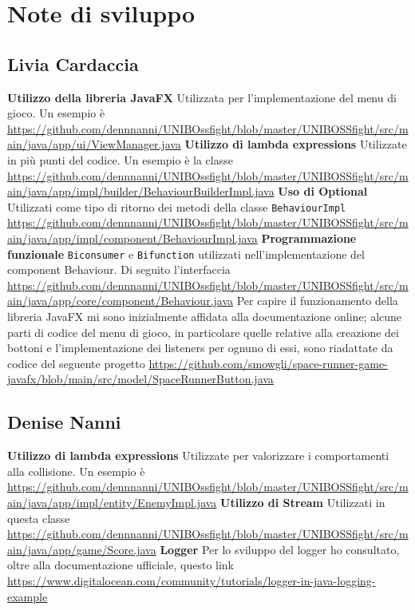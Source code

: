\documentclass[a4paper,12pt]{report}
\begin{document}
\section{Note di sviluppo}
\subsection{Livia Cardaccia}
\small
\textbf{Utilizzo della libreria JavaFX}
\newline
Utilizzata per l'implementazione del menu di gioco. Un esempio è \url{https://github.com/dennnanni/UNIBOssfight/blob/master/UNIBOSSfight/src/main/java/app/ui/ViewManager.java}
\newline
\textbf{Utilizzo di lambda expressions}
\newline
Utilizzate in più punti del codice. Un esempio è la classe \url{https://github.com/dennnanni/UNIBOssfight/blob/master/UNIBOSSfight/src/main/java/app/impl/builder/BehaviourBuilderImpl.java}
\newline
\textbf{Uso di Optional}
\newline
Utilizzati come tipo di ritorno dei metodi della classe \texttt{BehaviourImpl} \url{https://github.com/dennnanni/UNIBOssfight/blob/master/UNIBOSSfight/src/main/java/app/impl/component/BehaviourImpl.java}
\newline
\textbf{Programmazione funzionale}
\newline
\texttt{Biconsumer} e \texttt{Bifunction} utilizzati nell'implementazione del component Behaviour. Di seguito l'interfaccia \url{https://github.com/dennnanni/UNIBOssfight/blob/master/UNIBOSSfight/src/main/java/app/core/component/Behaviour.java}
\newline
\newline
\large
Per capire il funzionamento della libreria JavaFX mi sono inizialmente affidata alla documentazione online; alcune parti di codice del menu di gioco, in particolare quelle relative alla creazione dei bottoni e l'implementazione dei listeners per ognuno di essi, sono riadattate da codice del seguente progetto \url{https://github.com/smowgli/space-runner-game-javafx/blob/main/src/model/SpaceRunnerButton.java}
\subsection{Denise Nanni}

\small
\textbf{Utilizzo di lambda expressions}
\newline
Utilizzate per valorizzare i comportamenti alla collisione. Un esempio è \url{https://github.com/dennnanni/UNIBOssfight/blob/master/UNIBOSSfight/src/main/java/app/impl/entity/EnemyImpl.java}
\newline
\textbf{Utilizzo di Stream}
\newline
Utilizzati in questa classe \url{https://github.com/dennnanni/UNIBOssfight/blob/master/UNIBOSSfight/src/main/java/app/game/Score.java}
\newline
\textbf{Logger}
\newline
Per lo sviluppo del logger ho consultato, oltre alla documentazione ufficiale, questo link \url{https://www.digitalocean.com/community/tutorials/logger-in-java-logging-example}
\end{document}
